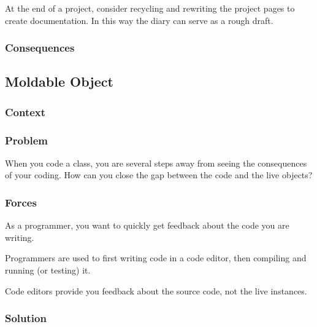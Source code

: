 \documentclass[sigconf]{acmart}
\begin{document}
At the end of a project, consider recycling and rewriting the project pages to create documentation. In this way the diary can serve as a rough draft.



\subsubsection*{Consequences}


\subsection*{Moldable Object}\label{pat:moldableObject}


\subsubsection*{Context}
\subsubsection*{Problem}

When you code a class, you are several steps away from seeing the consequences of your coding. How can you close the gap between the code and the live objects?

\subsubsection*{Forces}

As a programmer, you want to quickly get feedback about the code you are writing.

Programmers are used to first writing code in a code editor, then compiling and running (or testing) it.

Code editors provide you feedback about the source code, not the live instances.


\subsubsection*{Solution}
\end{document}
